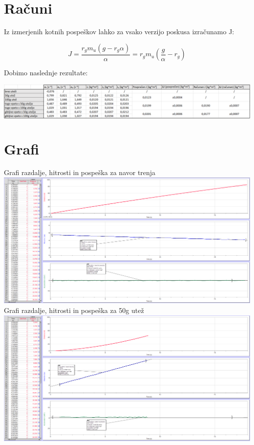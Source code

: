 \documentclass[a4paper]{report}
\begin{document}
\chapter*{Računi}
Iz izmerjenih kotnih pospeškov lahko za vsako verzijo poskusa izračunamo J:

\[J=\frac{r_g m_u (g-r_g\alpha)}{\alpha}=r_g m_u(\frac{g}{\alpha}-r_g)\]

\noindent Dobimo naslednje rezultate:

\includegraphics[width = \textwidth]{Tabela}


\chapter*{Grafi}

\noindent Grafi razdalje, hitrosti in pospeška za navor trenja\\
\includegraphics[width = \textwidth]{Trenje}\\

\noindent Grafi razdalje, hitrosti in pospeška za 50g utež\\
\includegraphics[width = \textwidth]{50g}\\
 
\end{document}

